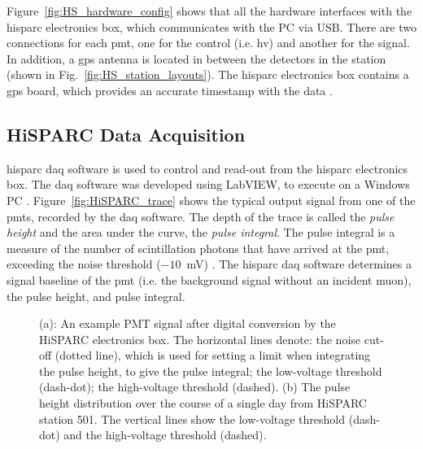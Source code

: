 Figure~\ref{fig:HS_hardware_config} shows that all the hardware interfaces with the \gls{hisparc} electronics box, which communicates with the PC via USB. There are two connections for each \gls{pmt}, one for the control (i.e. \gls{hv}) and another for the signal. In addition, a \gls{gps} antenna is located in between the detectors in the station (shown in Fig.~\ref{fig:HS_station_layouts}). The \gls{hisparc} electronics box contains a \gls{gps} board, which provides an accurate timestamp with the data \citep{fokkema_hisparc_2012}.



\subsection{HiSPARC Data Acquisition}

\gls{hisparc} \gls{daq} software is used to control and read-out from the \gls{hisparc} electronics box. The \gls{daq} software was developed using LabVIEW, to execute on a Windows PC \citep{van_dam_hisparc_2020}. Figure~\ref{fig:HiSPARC_trace} shows the typical output signal from one of the \glspl{pmt}, recorded by the \gls{daq} software. The depth of the trace is called the \textit{pulse height} and the area under the curve, the \textit{pulse integral}. The pulse integral is a measure of the number of scintillation photons that have arrived at the \gls{pmt}, exceeding the noise threshold ($-10$~mV) \citep{van_dam_hisparc_2020}. The \gls{hisparc} \gls{daq} software determines a signal baseline of the \gls{pmt} (i.e. the background signal without an incident muon), the pulse height, and pulse integral.

\begin{figure}[ht!]
	\centering
	
	\caption{(a): An example PMT signal after digital conversion by the HiSPARC electronics box. The horizontal lines denote: the noise cut-off (dotted line), which is used for setting a limit when integrating the pulse height, to give the pulse integral; the low-voltage threshold (dash-dot); the high-voltage threshold (dashed). (b) The pulse height distribution over the course of a single day from HiSPARC station 501. The vertical lines show the low-voltage threshold (dash-dot) and the high-voltage threshold (dashed).}
	\label{fig:pulses}
\end{figure}

